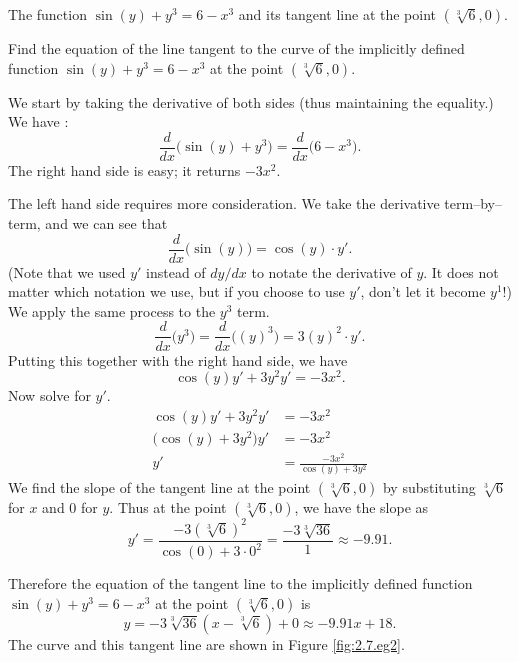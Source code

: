 \begin{marginfigure}[8cm]
\caption{The function $\sin(y)+y^3 = 6-x^3$ and its tangent line at the point $(\sqrt[3]{6},0)$.}\label{fig:2.7.eg2}
\end{marginfigure}

\begin{example} \label{Ex:2.7.Eg2}
Find the equation of the line tangent to the curve of the implicitly defined function $\sin(y) + y^3=6-x^3$ at the point $(\sqrt[3]6,0)$.

\solution We start by taking the derivative of both sides (thus maintaining the equality.) We have :
$$ \frac{d}{dx}\Big(\sin(y) + y^3\Big)=\frac{d}{dx}\Big(6-x^3\Big).$$
The right hand side is easy; it returns $-3x^2$. 

The left hand side requires more consideration. We take the derivative term--by--term, and we can see that 
$$\frac{d}{dx}\Big(\sin(y)\Big) = \cos(y) \cdot y'.$$ 
(Note that we used $y'$ instead of $dy/dx$ to notate the derivative of $y$.  It does not matter which notation we use, but if you choose to use $y'$, don't let it become $y^1$!) We apply the same process to the $y^3$ term. 
$$\frac{d}{dx}\Big(y^3\Big) = \frac{d}{dx}\Big((y)^3\Big) = 3(y)^2\cdot y'.$$
Putting this together with the right hand side, we have
$$\cos(y)y'+3y^2y' = -3x^2.$$
Now solve for $y'$.
\begin{align*}
\cos(y)y'+3y^2y' 	&= -3x^2\\
\big(\cos(y)+3y^2\big)y' &=	-3x^2\\
y'&= \frac{-3x^2}{\cos(y)+3y^2}
\end{align*}
We find the slope of the tangent line at the point  $(\sqrt[3]6,0)$ by substituting $\sqrt[3]6$ for $x$ and $0$ for $y$. Thus at the point $(\sqrt[3]6,0)$, we have the slope as $$y' = \frac{-3(\sqrt[3]{6})^2}{\cos(0) + 3\cdot0^2} = \frac{-3\sqrt[3]{36}}{1} \approx -9.91.$$

Therefore the equation of the tangent line to the implicitly defined function $\sin(y) + y^3=6-x^3$ at the point $(\sqrt[3]{6},0)$ is $$y = -3\sqrt[3]{36}(x-\sqrt[3]{6})+0 \approx -9.91x+18.$$ The curve and this tangent line are shown in Figure \ref{fig:2.7.eg2}.
\end{example}